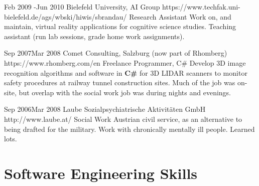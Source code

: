 \documentclass[10pt]{article} %
\begin{document}
\job
{Feb 2009 -}{Jun 2010}
{Bielefeld University, AI Group}
{https://www.techfak.uni-bielefeld.de/ags/wbski/hiwis/sbrandau/}
{Research Assistant}
{Work on, and maintain, virtual reality applications for cognitive science
  studies. Teaching assistant (run lab sessions, grade home work assignments).}


\job
{Sep 2007}{Mar 2008}
{Comet Consulting, Salzburg (now part of Rhomberg)}
{https://www.rhomberg.com/en}
{Freelance Programmer, C\#}
{Develop 3D image recognition algorithms and software in \textbf{C\#} for 3D
  LIDAR scanners to monitor safety procedures at railway tunnel construction
  sites. Much of the job was on-site, but overlap with the social work job was
  during nights and evenings.}


\job
{Sep 2006}{Mar 2008}
{Laube Sozialpsychiatrische Aktivitäten GmbH}
{http://www.laube.at/}
{Social Work}
{Austrian civil service, as an alternative to being drafted for the military.
  Work with chronically mentally ill people. Learned lots.}


\section{Software Engineering Skills}

\end{document}
